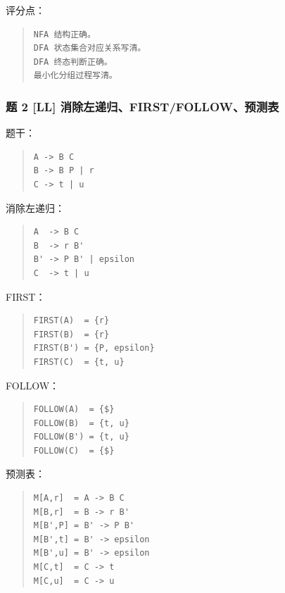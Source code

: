 \documentclass[UTF8,zihao=-4]{ctexart}
\begin{document}
评分点：


\begin{quote}
\footnotesize
\begin{verbatim}
NFA 结构正确。
DFA 状态集合对应关系写清。
DFA 终态判断正确。
最小化分组过程写清。
\end{verbatim}
\end{quote}


\subsubsection{题 2 [LL] 消除左递归、FIRST/FOLLOW、预测表}


题干：


\begin{quote}
\footnotesize
\begin{verbatim}
A -> B C
B -> B P | r
C -> t | u
\end{verbatim}
\end{quote}


消除左递归：


\begin{quote}
\footnotesize
\begin{verbatim}
A  -> B C
B  -> r B'
B' -> P B' | epsilon
C  -> t | u
\end{verbatim}
\end{quote}


FIRST：


\begin{quote}
\footnotesize
\begin{verbatim}
FIRST(A)  = {r}
FIRST(B)  = {r}
FIRST(B') = {P, epsilon}
FIRST(C)  = {t, u}
\end{verbatim}
\end{quote}


FOLLOW：


\begin{quote}
\footnotesize
\begin{verbatim}
FOLLOW(A)  = {$}
FOLLOW(B)  = {t, u}
FOLLOW(B') = {t, u}
FOLLOW(C)  = {$}
\end{verbatim}
\end{quote}


预测表：


\begin{quote}
\footnotesize
\begin{verbatim}
M[A,r]  = A -> B C
M[B,r]  = B -> r B'
M[B',P] = B' -> P B'
M[B',t] = B' -> epsilon
M[B',u] = B' -> epsilon
M[C,t]  = C -> t
M[C,u]  = C -> u
\end{verbatim}
\end{quote}
\end{document}
